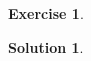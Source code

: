 \documentclass[10pt]{article}
\newcommand{\RR}{\mathbb R}
\newcommand{\CC}{\mathbb C}
\theoremstyle{Theorem}
\theoremstyle{definition}
\newtheorem{exe}{Exercise}
\newtheorem{sol}{Solution}
\theoremstyle{remark}
\theoremstyle{custom}
\begin{document}
\begin{exe} 





\end{exe} 


\begin{sol}

\end{sol}
\end{document}
